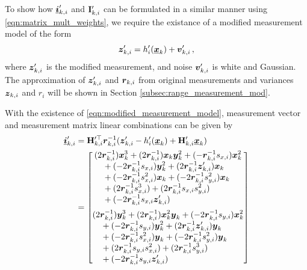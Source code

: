 \documentclass[twocolumn]{autart}
\begin{document}
To show how ${\boldsymbol{\underline{i}}}'_{k,i}$ and ${{\mathbf{I}}}'_{k,i}$ can be formulated in a similar manner using \eqref{eqn:matrix_mult_weights}, we require the existance of a modified measurement model of the form
\begin{equation}
    {\boldsymbol{z}}'_{k,i} = h'_i({\boldsymbol{\underline{x}}}_k)+{\boldsymbol{v}}'_{k,i}\,, \label{eqn:modified_measurement_model}
\end{equation}
where ${\boldsymbol{z}}'_{k,i}$ is the modified measurement, and noise ${\boldsymbol{v}}'_{k,i}$ is white and Gaussian. The approximation of ${\boldsymbol{z}}'_{k,i}$ and ${\boldsymbol{r}}_{k,i}$ from original measurements and variances ${\boldsymbol{z}}_{k,i}$ and $r_i$ will be shown in Section \ref{subsec:range_measurement_mod}. 

With the existence of \eqref{eqn:modified_measurement_model}, measurement vector and measurement matrix linear combinations can be given by
\begin{equation}
    \begin{split}
        \rvec{i}'_{k,i} &= \mat{H}_{k,i}^{\prime\top} \rv{r}_{k,i}^{-1}(\rv{z}'_{k,i} - h'_i(\rvec{x}_k) + \mat{H}'_{k,i}\rvec{x}_k) \\
        &= 
        \begin{bmatrix}
            \begin{split}
                &(2\rv{r}_{k,i}^{-1})\rv{x}_k^3 + (2\rv{r}_{k,i}^{-1})\rv{x}_k\rv{y}_k^2 + (-\rv{r}_{k,i}^{-1}s_{x,i})\rv{x}_k^2 \\
                &\quad+ (-2\rv{r}_{k,i}^{-1}s_{x,i})\rv{y}_k^2 + (2\rv{r}_{k,i}^{-1}\rv{z}'_{k,i})\rv{x}_k \\
                &\quad+ (-2\rv{r}_{k,i}^{-1}s_{x,i}^2)\rv{x}_k + (-2\rv{r}_{k,i}^{-1}s_{y,i}^2)\rv{x}_k \\
                &\quad+ (2\rv{r}_{k,i}^{-1}s_{x,i}^3) + (2\rv{r}_{k,i}^{-1}s_{x,i}s_{y,i}^2) \\
                &\quad+ (-2\rv{r}_{k,i}^{-1}s_{x,i} \rv{z}'_{k,i})
            \end{split}
            \vspace{5pt}\\
            \begin{split}
                &(2\rv{r}_{k,i}^{-1})\rv{y}_k^3 + (2\rv{r}_{k,i}^{-1})\rv{x}_k^2\rv{y}_k + (-2\rv{r}_{k,i}^{-1}s_{y,i})\rv{x}_k^2 \\
                &\quad+ (-2\rv{r}_{k,i}^{-1}s_{y,i})\rv{y}_k^2 + (2\rv{r}_{k,i}^{-1}\rv{z}'_{k,i})\rv{y}_k \\
                &\quad+ (-2\rv{r}_{k,i}^{-1}s_{x,i}^2)\rv{y}_k + (-2\rv{r}_{k,i}^{-1}s_{y,i}^2)\rv{y}_k \\
                &\quad+ (2\rv{r}_{k,i}^{-1}s_{y,i}s_{x,i}^2) + (2\rv{r}_{k,i}^{-1}s_{y,i}^3) \\
                &\quad+ (-2\rv{r}_{k,i}^{-1}s_{y,i}\rv{z}'_{k,i})
            \end{split}
        \end{bmatrix}
    \end{split} \label{eqn:hrz_linear_comb}
\end{equation}
\end{document}
